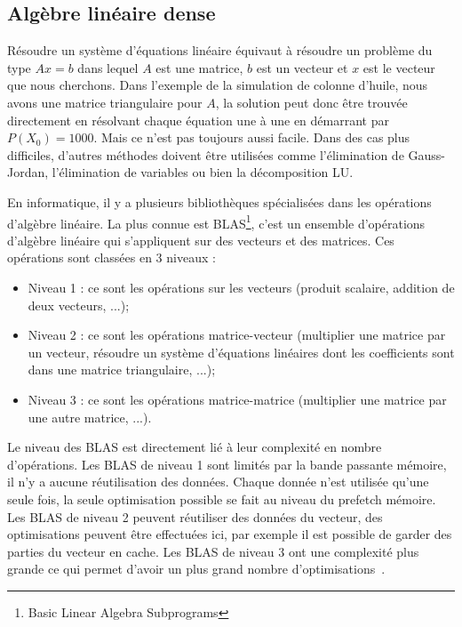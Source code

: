 \subsection{Algèbre linéaire dense}
Résoudre un système d'équations linéaire équivaut à résoudre un problème du type $Ax=b$ dans lequel $A$ est une matrice, $b$ est un vecteur et $x$ est le vecteur que nous cherchons.
%
Dans l'exemple de la simulation de colonne d'huile, nous avons une matrice triangulaire pour $A$, la solution peut donc être trouvée directement en résolvant chaque équation une à une en démarrant par $P(X_0) = 1000$.
%
Mais ce n'est pas toujours aussi facile.
%
Dans des cas plus difficiles, d'autres méthodes doivent être utilisées comme l'élimination de Gauss-Jordan, l'élimination de variables ou bien la décomposition LU.


En informatique, il y a plusieurs bibliothèques spécialisées dans les opérations d'algèbre linéaire.
%
La plus connue est BLAS\footnote{Basic Linear Algebra Subprograms}, c'est un ensemble d'opérations d'algèbre linéaire qui s'appliquent sur des vecteurs et des matrices.
%
Ces opérations sont classées en 3 niveaux :
\begin{itemize}
  \item Niveau 1 : ce sont les opérations sur les vecteurs (produit scalaire, addition de deux vecteurs, ...);
  \item Niveau 2 : ce sont les opérations matrice-vecteur (multiplier une matrice par un vecteur, résoudre un système d'équations linéaires dont les coefficients sont dans une matrice triangulaire, ...);
  \item Niveau 3 : ce sont les opérations matrice-matrice (multiplier une matrice par une autre matrice, ...).
\end{itemize}
%
Le niveau des BLAS est directement lié à leur complexité en nombre d'opérations.
%
Les BLAS de niveau 1 sont limités par la bande passante mémoire, il n'y a aucune réutilisation des données.
%
Chaque donnée n'est utilisée qu'une seule fois, la seule optimisation possible se fait au niveau du prefetch mémoire.
%
Les BLAS de niveau 2 peuvent réutiliser des données du vecteur, des optimisations peuvent être effectuées ici, par exemple il est possible de garder des parties du vecteur en cache.
%
Les BLAS de niveau 3 ont une complexité plus grande ce qui permet d'avoir un plus grand nombre d'optimisations~\cite{blas3_opt}.

